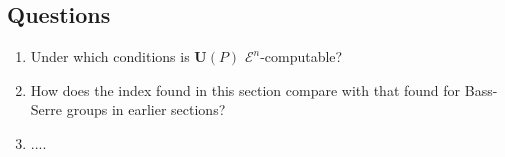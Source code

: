\documentclass[a4paper]{article}
\newcommand{\grz}[1]{$\mathcal{E}^{#1}$}	%
\newcommand{\Uvec}{\mathbf{U}}	%
\newcommand{\UP}{\Uvec(P)}
\newcommand{\be}{\begin{enumerate}}
\newcommand{\ee}{\end{enumerate}}
\theoremstyle{plain}
\theoremstyle{definition}
\begin{document}
\subsection{Questions}
\be
\item Under which conditions is $\UP$ \grz{n}-computable?
\item How does the index found in this section compare with that found for Bass-Serre groups in
earlier sections?
\item ....
\ee


\end{document}
